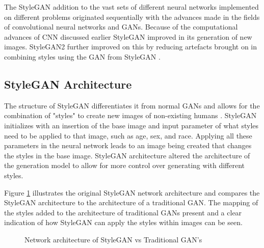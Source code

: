 The StyleGAN addition to the vast sets of different neural networks implemented on different problems originated sequentially with the advances made in the fields of convolutional neural networks and GANs. Because of the computational advances of CNN discussed earlier StyleGAN improved in its generation of new images. StyleGAN2 further improved on this by reducing artefacts brought on in combining styles using the GAN from StyleGAN \citep{Karras2020}.

\subsection{StyleGAN Architecture}

The structure of StyleGAN differentiates it from normal GANs and allows for the combination of "styles" to create new images of non-existing humans \citep{Karras2019}. StyleGAN initializes with an insertion of the base image and input parameter of what styles need to be applied to that image, such as age, sex, and race. Applying all these parameters in the neural network leads to an image being created that changes the styles in the base image. StyleGAN architecture altered the architecture of the generation model to allow for more control over generating with different styles.

Figure \ref{fig:7} illustrates the original StyleGAN network architecture and compares the StyleGAN architecture to the architecture of a traditional GAN. The mapping of the styles added to the architecture of traditional GANs present and a clear indication of how StyleGAN can apply the styles within images can be seen.

\begin{figure}[H]%
\centering
{}%
\caption{Network architecture of StyleGAN vs Traditional GAN's \citep{Karras2019}}%
\label{fig:7}%
\end{figure}

